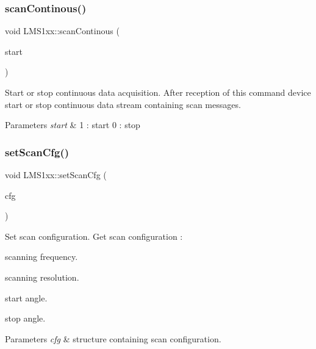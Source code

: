 \subsubsection{\texorpdfstring{scan\+Continous()}{scanContinous()}}
{\footnotesize\ttfamily void L\+M\+S1xx\+::scan\+Continous (\begin{DoxyParamCaption}\item[{int}]{start }\end{DoxyParamCaption})}



Start or stop continuous data acquisition. After reception of this command device start or stop continuous data stream containing scan messages. 


\begin{DoxyParams}{Parameters}
{\em start} & 1 \+: start 0 \+: stop \\
\hline
\end{DoxyParams}
\mbox{\label{classLMS1xx_aa0feadf2fefe3c8145d9cb67d02f058c}} 
\subsubsection{\texorpdfstring{set\+Scan\+Cfg()}{setScanCfg()}}
{\footnotesize\ttfamily void L\+M\+S1xx\+::set\+Scan\+Cfg (\begin{DoxyParamCaption}\item[{const \hyperlink{structscanCfg}{scan\+Cfg} \&}]{cfg }\end{DoxyParamCaption})}



Set scan configuration. Get scan configuration \+: 


\begin{DoxyItemize}
\item scanning frequency.
\item scanning resolution.
\item start angle.
\item stop angle. 
\begin{DoxyParams}{Parameters}
{\em cfg} & structure containing scan configuration. \\
\hline
\end{DoxyParams}

\end{DoxyItemize}\mbox{\label{classLMS1xx_ac8cdbf56a26b60f8cf202d307e57f08c}} 
